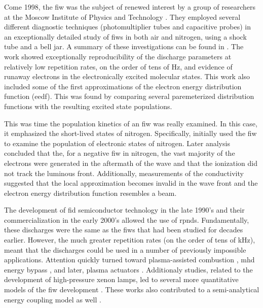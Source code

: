 Come 1998, the fiw was the subject of renewed interest by a group of researchers
at the Moscow Institute of Physics and Technology \cite{Anikin1998}. They
employed several different diagnostic techniques (photomultiplier tubes and
capacitive probes) in an exceptionally detailed study of fiws in both air and
nitrogen, using a shock tube and a bell jar. A summary of these investigations
can be found in \cite{Starikovskaia2001}. The work showed exceptionally
reproducibility of the discharge parameters at relatively low repetition rates,
on the order of tens of Hz, and evidence of runaway electrons in the
electronically excited molecular states. This work also included some of the
first approximations of the electron energy distribution function (\acs{eedf}).
This was found by comparing several paremeterized distribution functions with
the resulting excited state populations. 

This was time the population kinetics of an fiw was really examined. In this
case, it emphasized the short-lived states of nitrogen. Specifically,
\cite{Pancheshnyi1998} initially used the fiw to examine the population
of electronic states of nitrogen. Later analysis \cite{Pancheshnyi1999}
concluded that the, for a negative fiw in nitrogen, the vast majority of
the electrons were generated in the aftermath of the wave and that the
ionization did not track the luminous front. Additionally, measurements
of the conductivity suggested that the local approximation becomes
invalid in the wave front and the electron energy distribution function
resembles a beam.

The development of fid semiconductor technology in the late 1990's and
their commercialization in the early 2000's allowed the use of rpnds.
Fundamentally, these discharges were the same as the fiws that had been
studied for decades earlier. However, the much greater repetition rates
(on the order of tens of kHz), meant that the discharges could be used
in a number of previously impossible applications. Attention quickly
turned toward plasma-assisted combustion \cite{Starikoskaia2006}, mhd
energy bypass \cite{Macheret2002}, and later, plasma actuators
\cite{Adamovich2009}. Additionaly studies, related to the development of
high-pressure xenon lamps, led to several more quantitative models of
the fiw development \cite{Nikandrov2008, Tsendin2009}. These works also
contributed to a semi-analytical energy coupling model as well
\cite{Adamovich2009}.

